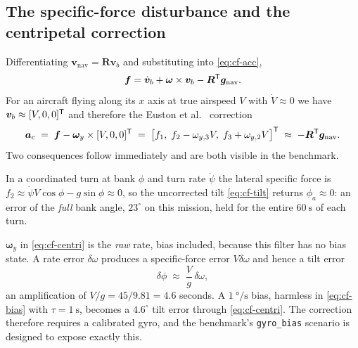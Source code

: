 \subsection{The specific-force disturbance and the centripetal correction}
Differentiating $\bm{v}_{\text{nav}}=\bm{R}\bm{v}_b$ and substituting into \eqref{eq:cf-acc},
\begin{equation}
\bm{f} = \dot{\bm{v}}_b + \bm{\omega}\times\bm{v}_b - \bm{R}^{\mathsf{T}}\bm{g}_{\text{nav}} .
\label{eq:cf-sf}
\end{equation}
For an aircraft flying along its $x$ axis at true airspeed $V$ with $\dot V\approx0$ we have
$\bm{v}_b\approx[V,0,0]^{\mathsf{T}}$ and therefore the Euston et al.~\cite{euston2008} correction
\begin{equation}
\bm{a}_c \;=\; \bm{f} - \bm{\omega}_y\times[V,0,0]^{\mathsf{T}}
 \;=\; \big[f_1,\; f_2-\omega_{y,3}V,\; f_3+\omega_{y,2}V\big]^{\mathsf{T}}
 \;\approx\; -\bm{R}^{\mathsf{T}}\bm{g}_{\text{nav}} .
\label{eq:cf-centri}
\end{equation}
Two consequences follow immediately and are both visible in the benchmark.
\begin{remark}
In a coordinated turn at bank $\phi$ and turn rate $\dot\psi$ the lateral specific force is
$f_2 \approx \dot\psi V\cos\phi - g\sin\phi \approx 0$, so the uncorrected tilt
\eqref{eq:cf-tilt} returns $\phi_a\approx0$: an error of the \emph{full} bank angle,
$23^\circ$ on this mission, held for the entire $\SI{60}{\second}$ of each turn.
\end{remark}
\begin{remark}\label{rem:cf-cost}
$\bm{\omega}_y$ in \eqref{eq:cf-centri} is the \emph{raw} rate, bias included, because this filter
has no bias state. A rate error $\delta\omega$ produces a specific-force error $V\delta\omega$ and
hence a tilt error
\begin{equation}
\delta\phi \;\approx\; \frac{V}{g}\,\delta\omega ,
\label{eq:cf-amplify}
\end{equation}
an amplification of $V/g = 45/9.81 = 4.6$ seconds. A $\SI{1}{\degree\per\second}$ bias, harmless in
\eqref{eq:cf-bias} with $\tau=\SI{1}{\second}$, becomes a $4.6^\circ$ tilt error through
\eqref{eq:cf-centri}. The correction therefore requires a calibrated gyro, and the benchmark's
\texttt{gyro\_bias} scenario is designed to expose exactly this.
\end{remark}

